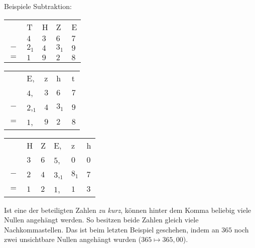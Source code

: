Beispiele Subtraktion:\\
\begin{tabular}{cllll}
	& T     & H   & Z     & E   \\
	& $4$   & $3$ & $6$   & $7$ \\
	$-$ & $2_1$ & $4$ & $3_1$ & $9$ \\ \hline
	$=$ & $1$   & $9$ & $2$   & $8$
\end{tabular}
%
\hfill
%
\begin{tabular}{cllll}
	& E,       & z   & h     & t   \\
	& $4$,     & $3$ & $6$   & $7$ \\
	$-$ & $2$,$_1$ & $4$ & $3_1$ & $9$ \\ \hline
	$=$ & $1$,     & $9$ & $2$   & $8$
\end{tabular}
%
\hfill
%
\begin{tabular}{clllll}
	& H     & Z   & E,       & z     & h   \\
	& $3$   & $6$ & $5$,     & $0$   & $0$ \\
	$-$ & $2$ & $4$ & $3$,$_1$ & $8_1$ & $7$ \\ \hline
	$=$  & $1$   & $2$ & $1$,     & $1$   & $3$
\end{tabular}

Ist eine der beteiligten Zahlen \emph{zu kurz}, können hinter dem Komma beliebig viele Nullen angehängt werden. So besitzen beide Zahlen gleich viele Nachkommastellen. Das ist beim letzten Beispiel geschehen, indem an $365$ noch zwei \glqq{}unsichtbare Nullen\grqq{} angehängt wurden ($365 \mapsto 365{,}00$).